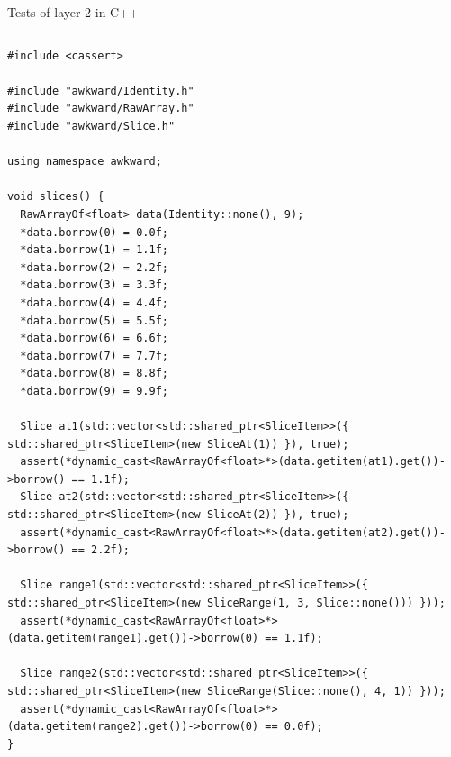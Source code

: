 \documentclass[aspectratio=169]{beamer}
\begin{document}
\begin{frame}[fragile]{Tests of layer 2 in C++}
\tiny
\vspace{0.05 cm}
\begin{columns}
\begin{verbatim}
#include <cassert>

#include "awkward/Identity.h"
#include "awkward/RawArray.h"
#include "awkward/Slice.h"

using namespace awkward;

void slices() {
  RawArrayOf<float> data(Identity::none(), 9);
  *data.borrow(0) = 0.0f;
  *data.borrow(1) = 1.1f;
  *data.borrow(2) = 2.2f;
  *data.borrow(3) = 3.3f;
  *data.borrow(4) = 4.4f;
  *data.borrow(5) = 5.5f;
  *data.borrow(6) = 6.6f;
  *data.borrow(7) = 7.7f;
  *data.borrow(8) = 8.8f;
  *data.borrow(9) = 9.9f;

  Slice at1(std::vector<std::shared_ptr<SliceItem>>({ std::shared_ptr<SliceItem>(new SliceAt(1)) }), true);
  assert(*dynamic_cast<RawArrayOf<float>*>(data.getitem(at1).get())->borrow() == 1.1f);
  Slice at2(std::vector<std::shared_ptr<SliceItem>>({ std::shared_ptr<SliceItem>(new SliceAt(2)) }), true);
  assert(*dynamic_cast<RawArrayOf<float>*>(data.getitem(at2).get())->borrow() == 2.2f);

  Slice range1(std::vector<std::shared_ptr<SliceItem>>({ std::shared_ptr<SliceItem>(new SliceRange(1, 3, Slice::none())) }));
  assert(*dynamic_cast<RawArrayOf<float>*>(data.getitem(range1).get())->borrow(0) == 1.1f);

  Slice range2(std::vector<std::shared_ptr<SliceItem>>({ std::shared_ptr<SliceItem>(new SliceRange(Slice::none(), 4, 1)) }));
  assert(*dynamic_cast<RawArrayOf<float>*>(data.getitem(range2).get())->borrow(0) == 0.0f);
}
\end{verbatim}
\end{columns}
\end{frame}
\end{document}
